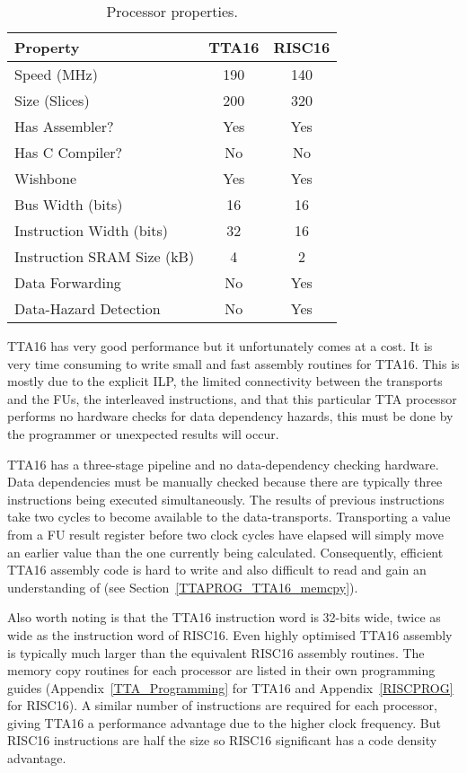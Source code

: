\begin{table}[h!]
\begin{center}
\begin{tabular}{l c c}
Property					& TTA16	& RISC16	\\
\hline
Speed (MHz)					&	190	&	140		\\
Size (Slices)				&	200	&	320		\\
Has Assembler?				&	Yes	&	Yes		\\
Has C Compiler?				&	No	&	No		\\
Wishbone					&	Yes	&	Yes		\\
Bus Width (bits)			&	16	&	16		\\
Instruction Width (bits)	&	32	&	16		\\
Instruction SRAM Size (kB)	&	4	&	2		\\
Data Forwarding				&	No	&	Yes		\\
Data-Hazard Detection		&	No	&	Yes		\\
\end{tabular}
\end{center}
\caption[Processor properties]{Processor properties.}
\label{CPU_Table}
\end{table}

TTA16 has very good performance but it unfortunately comes at a cost. It is very
time consuming to write small and fast assembly routines for TTA16. This is
mostly due to the explicit ILP, the limited connectivity between the transports
and the FUs, the interleaved instructions, and that this particular TTA processor
performs no hardware checks for data dependency hazards, this must be done by the
programmer or unexpected results will occur.

TTA16 has a three-stage pipeline and no data-dependency checking hardware. Data
dependencies must be manually checked because there are typically three
instructions being executed simultaneously. The results of previous instructions
take two cycles to become available to the data-transports. Transporting a value
from a FU result register before two clock cycles have elapsed will simply move
an earlier value than the one currently being calculated. Consequently, efficient
TTA16 assembly code is hard to write and also difficult to read and gain an
understanding of (see Section~\ref{TTAPROG_TTA16_memcpy}).

Also worth noting is that the TTA16 instruction word is 32-bits wide, twice as
wide as the instruction word of RISC16. Even highly optimised TTA16 assembly is
typically much larger than the equivalent RISC16 assembly routines. The memory
copy routines for each processor are listed in their own programming guides
(Appendix~\ref{TTA_Programming} for TTA16 and Appendix~\ref{RISCPROG} for
RISC16). A similar number of instructions are required for each processor, giving
TTA16 a performance advantage due to the higher clock frequency. But RISC16
instructions are half the size so RISC16 significant has a code density
advantage.
